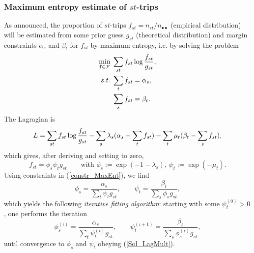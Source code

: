 \documentclass{bmcart}
\begin{document}
\subsubsection{Maximum entropy estimate of $st$-trips}
\label{maxenso}
As announced,  the proportion of $st$-trips $f_{st}=n_{st}/n_{\bullet\bullet}$ (empirical distribution) will be estimated from some prior guess $g_{st}$ (theoretical distribution) and 
margin constraints $\alpha_s$ and $\beta_t$ for $f_{st}$ by maximum entropy, i.e. by 
solving the problem 
\begin{align}
	\label{constr_MaxEnt}
	\min_{\mathbf{f}\in\mathcal{F}} &\; \sum_{st}f_{st}\log \frac{f_{st}}{g_{st}}, \notag \\
	s.t. &\; \sum_t f_{st} = \alpha_s, \notag \\
	&\; \sum_s f_{st} = \beta_t.
\end{align}
The Lagragian is
\begin{equation}
	L = \sum_{st}f_{st}\log \frac{f_{st}}{g_{st}} - \sum_s \lambda_s (\alpha_s - \sum_t f_{st}) - \sum_t \mu_t (\beta_t - \sum_s f_{st}), \notag
\end{equation}
which gives, after deriving and setting to zero,
\begin{equation}
	\label{Sol}
	f_{st} = \phi_s \psi_t g_{st} \qquad \text{with } \phi_s := \exp(- 1 - \lambda_s) \text{, } \psi_t := \exp(- \mu_t).
\end{equation}
Using constraints in (\ref{constr_MaxEnt}), we find
\begin{equation}
	\label{Sol_LagMult}
	\phi_s = \frac{\alpha_s}{\sum_t \psi_t g_{st}}, \qquad \psi_t = \frac{\beta_t}{\sum_s \phi_s g_{st}}, 
\end{equation}
which yields the following \emph{iterative fitting algorithm}: starting with some $\psi^{(0)}_t > 0$, one performs the iteration
\begin{equation}
	\label{Iterative fitting}
	\phi^{(\iota)}_s = \frac{\alpha_s}{\sum_t \psi^{(\iota)}_t g_{st}}, \qquad \psi^{(\iota + 1)}_t = \frac{\beta_t}{\sum_s \phi^{(\iota)}_s g_{st}}, 
\end{equation}
until convergence to $\phi_s$ and $\psi_t$ obeying (\ref{Sol_LagMult}). 
\end{document}

